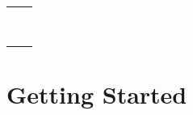 \documentclass{article}
\begin{document}
\begin{multicols}{2}
\begin{tabularx}{\textwidth/2}{X|l}
     \texttt{\textbf{}}\\
    \\
    \hline
    
    \texttt{\textbf{}}\\
    \\
    \hline
    
     \texttt{\textbf{}}\\
    \\
    \hline
    
    \texttt{\textbf{}}\\
    \\
    \hline
  \end{tabularx}

    
  \section{\textbf{Getting Started}}

  \newpage
  \pagebreak

  \end{multicols}
\end{document}
